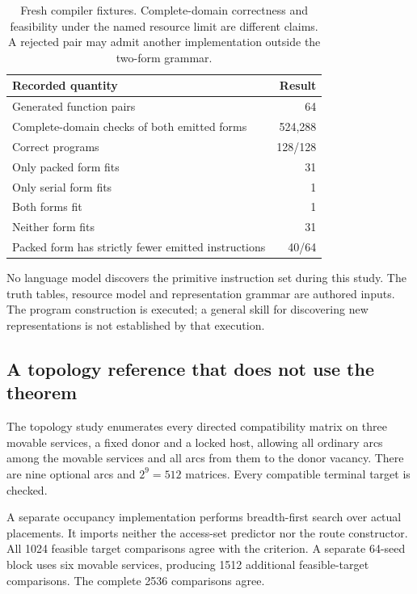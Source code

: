 \documentclass[11pt,letterpaper]{article}
\theoremstyle{definition}\newtheorem{definition}[theorem]{Definition}
\theoremstyle{remark}\newtheorem{remark}[theorem]{Remark}
\begin{document}
\begin{table}[htbp]\centering\small
\caption{Fresh compiler fixtures. Complete-domain correctness and feasibility under the named resource limit are different claims. A rejected pair may admit another implementation outside the two-form grammar.}
\begin{tabularx}{\linewidth}{@{}Yr@{}}\toprule
Recorded quantity & Result\\\midrule
Generated function pairs & 64\\
Complete-domain checks of both emitted forms & 524,288\\
Correct programs & 128/128\\
Only packed form fits & 31\\
Only serial form fits & 1\\
Both forms fit & 1\\
Neither form fits & 31\\
Packed form has strictly fewer emitted instructions & 40/64\\\bottomrule
\end{tabularx}
\label{tab:programstudy}
\end{table}

No language model discovers the primitive instruction set during this study. The truth tables, resource model and representation grammar are authored inputs. The program construction is executed; a general skill for discovering new representations is not established by that execution.

\subsection{A topology reference that does not use the theorem}
The topology study enumerates every directed compatibility matrix on three movable services, a fixed donor and a locked host, allowing all ordinary arcs among the movable services and all arcs from them to the donor vacancy. There are nine optional arcs and $2^9=512$ matrices. Every compatible terminal target is checked.

A separate occupancy implementation performs breadth-first search over actual placements. It imports neither the access-set predictor nor the route constructor. All 1024 feasible target comparisons agree with the criterion. A separate 64-seed block uses six movable services, producing 1512 additional feasible-target comparisons. The complete 2536 comparisons agree.
\end{document}
